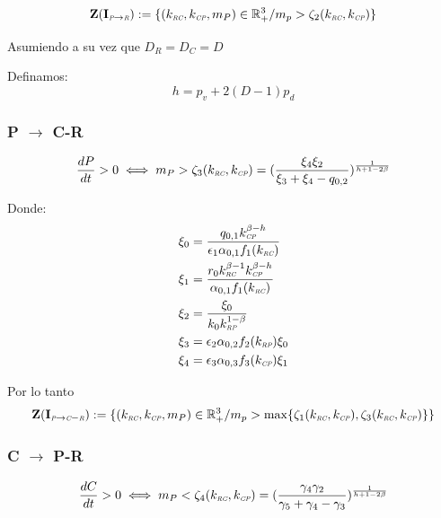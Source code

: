 \begin{equation}
\mathbf{Z(I_{\textit{\tiny P} \to \textit{\tiny R}})} := \{ (k_{\textit{\tiny RC}},k_{\textit{\tiny CP}},m_P) \in \mathbb{R}^3_+ / m_p > \zeta_2(k_{\textit{\tiny RC}},k_{\textit{\tiny CP}}) \}
\end{equation}

Asumiendo a su vez que $D_R = D_C = D$

Definamos:
\begin{equation}
  h = p_v + 2(D-1)p_d
\end{equation}

\subsubsection{P $\to$ C-R}
\begin{equation}
  \frac{dP}{dt}  >0 \iff m_P > \zeta_3(k_{\textit{\tiny RC}},k_{\textit{\tiny CP}}) = (\frac{\xi_4\xi_2}{\xi_3 + \xi_4 - q_{0,2}})^{\frac{1}{h + 1 - 2\beta}}
\end{equation}

Donde:
\begin{equation}
  \begin{aligned}
    \xi_0 &= \frac{q_{0,1} k_{\textit{\tiny CP}}^{\beta - h}}{\epsilon_1 \alpha_{0,1} f_1(k_{\textit{\tiny RC}})}\\
    \xi_1 &= \frac{r_0 k_{\textit{\tiny RC}}^{\beta -1}k_{\textit{\tiny CP}}^{\beta-h}}{\alpha_{0,1} f_1(k_{\textit{\tiny RC}})}\\
    \xi_2 &= \frac{\xi_0}{k_0 k_{\textit{\tiny RP}}^{1-\beta}} \\
    \xi_3 &= \epsilon_2 \alpha_{0,2} f_2(k_{\textit{\tiny RP}}) \xi_0\\
    \xi_4 &=\epsilon_3 \alpha_{0,3} f_3(k_{\textit{\tiny CP}}) \xi_1
  \end{aligned}
\end{equation}

Por lo tanto 
\begin{equation}
\mathbf{Z(I_{\textit{\tiny P} \to \textit{\tiny C}-\textit{\tiny R}})} := \{ (k_{\textit{\tiny RC}},k_{\textit{\tiny CP}},m_P) \in \mathbb{R}^3_+ / m_p > \max\{\zeta_1(k_{\textit{\tiny RC}},k_{\textit{\tiny CP}}),\zeta_3(k_{\textit{\tiny RC}},k_{\textit{\tiny CP}})\} \}
\end{equation}

\subsubsection{C $\to$ P-R}
\begin{equation}
  \frac{dC}{dt}  >0 \iff m_P < \zeta_4(k_{\textit{\tiny RC}},k_{\textit{\tiny CP}}) = (\frac{\gamma_4\gamma_2}{\gamma_5 + \gamma_4 - \gamma_3})^{\frac{1}{h + 1 - 2\beta}}
\end{equation}

